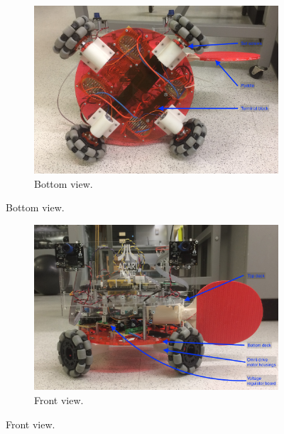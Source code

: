 \documentclass[letterpaper, 11pt]{article}
\begin{document}
\begin{enumerate}[label=\textbf{\arabic*.}]
\begin{figure}[H]
    \begin{subfigure}[t]{0.8\textwidth}
        \includegraphics[width=\textwidth]{images/bottom.JPG}
        \caption{Bottom view.}
    \end{subfigure}
\end{figure}

\begin{figure}[H]\ContinuedFloat
    \centering
    \begin{subfigure}[t]{0.8\textwidth}
        \includegraphics[width=\textwidth]{images/front.JPG}
        \caption{Front view.}
    \end{subfigure}


\end{figure}
\end{enumerate}
\end{document}
